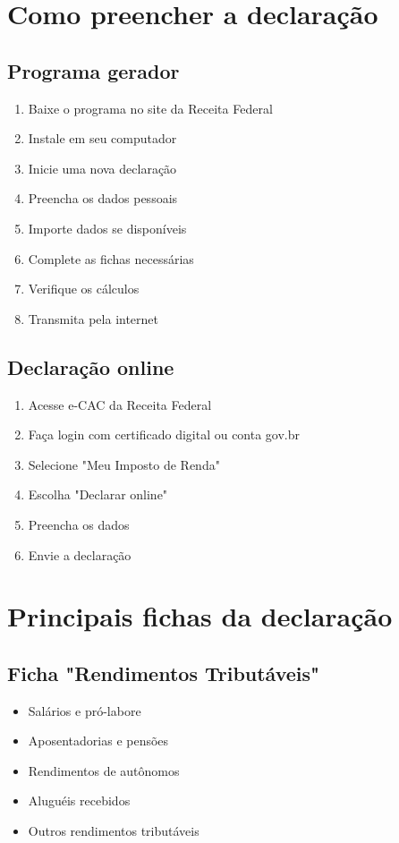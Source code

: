 \documentclass[12pt,a4paper]{article}
\begin{document}
\section{Como preencher a declaração}

\subsection{Programa gerador}
\begin{enumerate}
    \item Baixe o programa no site da Receita Federal
    \item Instale em seu computador
    \item Inicie uma nova declaração
    \item Preencha os dados pessoais
    \item Importe dados se disponíveis
    \item Complete as fichas necessárias
    \item Verifique os cálculos
    \item Transmita pela internet
\end{enumerate}

\subsection{Declaração online}
\begin{enumerate}
    \item Acesse e-CAC da Receita Federal
    \item Faça login com certificado digital ou conta gov.br
    \item Selecione "Meu Imposto de Renda"
    \item Escolha "Declarar online"
    \item Preencha os dados
    \item Envie a declaração
\end{enumerate}

\section{Principais fichas da declaração}

\subsection{Ficha "Rendimentos Tributáveis"}
\begin{itemize}
    \item Salários e pró-labore
    \item Aposentadorias e pensões
    \item Rendimentos de autônomos
    \item Aluguéis recebidos
    \item Outros rendimentos tributáveis
\end{itemize}
\end{document}
